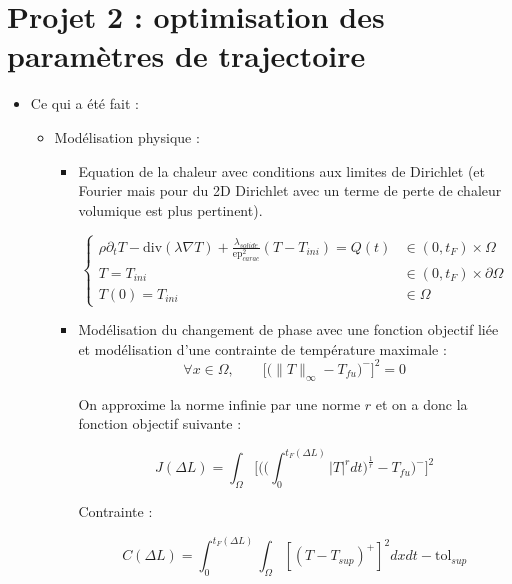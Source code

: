 \documentclass[11pt,a4paper]{article}
\begin{document}
\section{Projet 2 : optimisation des paramètres de trajectoire}

\begin{itemize}
	\item Ce qui a été fait :
	
		\begin{itemize}
			\item Modélisation physique : 
			\begin{itemize}
				\item Equation de la chaleur avec conditions aux limites de Dirichlet (et Fourier mais pour du 2D Dirichlet avec un terme de perte de chaleur volumique est plus pertinent).
				
				\begin{equation}
				\left\{
				\begin{array}{ll}
				\rho\partial_t T-\textrm{div}(\lambda\nabla T)+\frac{\lambda_{solide}}{\textrm{ep}_{carac}^2}(T-T_{ini})=Q(t) & \in (0,t_F)\times \Omega \\
				T=T_{ini} & \in (0,t_F)\times \partial\Omega \\
				T(0)=T_{ini} & \in\Omega 
				\end{array}
				\right.
				\end{equation}
				
				\item Modélisation du changement de phase avec une fonction objectif liée et modélisation d'une contrainte de température maximale :
				\begin{equation}
				\forall x\in\Omega,\qquad \Big[\Big(\|T\|_{\infty}-T_{fu}\Big)^-\Big]^2=0
				\end{equation}
				
				On approxime la norme infinie par une norme $r$ et on a donc la fonction objectif suivante :
				
				\begin{equation}
				J(\Delta L)=\int_{\Omega}\Bigg[\Bigg(\Big(\int_{0}^{t_F(\Delta L)}|T|^rdt\Big)^{\frac{1}{r}}-T_{fu}\Bigg)^-\Bigg]^2
				\end{equation}
				
				Contrainte :
				
				\begin{equation}
				\label{eq:contrainte}
				C(\Delta L)=\int_{0}^{t_F(\Delta L)}\int_{\Omega}[(T-T_{sup})^+]^2dxdt-\textrm{tol}_{sup}
				\end{equation} 
				

\end{itemize}
\end{itemize}
\end{itemize}
\end{document}
